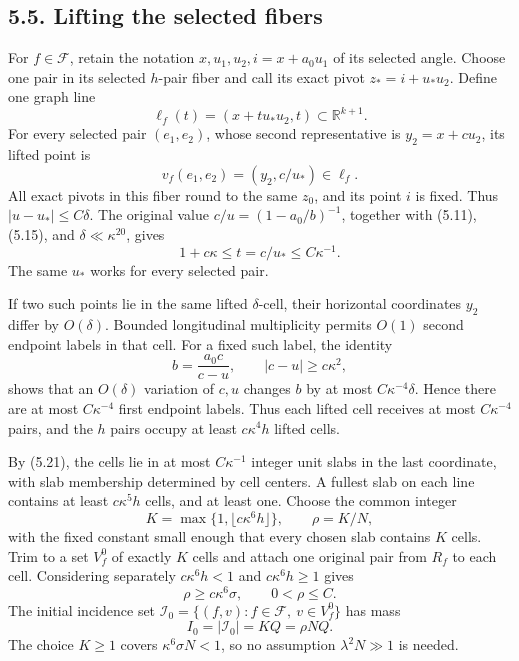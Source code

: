 \documentclass[
  11pt,
  a4paper,
]{article}
\begin{document}
\hypertarget{lifting-the-selected-fibers}{%
\subsection{5.5. Lifting the selected
fibers}\label{lifting-the-selected-fibers}}

For \(f\in\mathcal F\), retain the notation \(x,u_1,u_2,i=x+a_0u_1\) of
its selected angle. Choose one pair in its selected \(h\)-pair fiber and
call its exact pivot \(z_*=i+u_*u_2\). Define one graph line \[
 \ell_f(t)=(x+t u_*u_2,t)\subset\mathbb R^{k+1}.  \tag{5.20}\label{eq:5.20}
\] For every selected pair \((e_1,e_2)\), whose second representative is
\(y_2=x+c u_2\), its lifted point is \[
 v_f(e_1,e_2)=(y_2,c/u_*)\in\ell_f.
\] All exact pivots in this fiber round to the same \(z_0\), and its
point \(i\) is fixed. Thus \(|u-u_*|\le C\delta\). The original value
\(c/u=(1-a_0/b)^{-1}\), together with (5.11), (5.15), and
\(\delta\ll\kappa^{20}\), gives \[
 1+c\kappa\le t=c/u_*\le C\kappa^{-1}.           \tag{5.21}\label{eq:5.21}
\] The same \(u_*\) works for every selected pair.

If two such points lie in the same lifted \(\delta\)-cell, their
horizontal coordinates \(y_2\) differ by \(O(\delta)\). Bounded
longitudinal multiplicity permits \(O(1)\) second endpoint labels in
that cell. For a fixed such label, the identity \[
 b=\frac{a_0c}{c-u},\qquad |c-u|\ge c\kappa^2,
\] shows that an \(O(\delta)\) variation of \(c,u\) changes \(b\) by at
most \(C\kappa^{-4}\delta\). Hence there are at most \(C\kappa^{-4}\)
first endpoint labels. Thus each lifted cell receives at most
\(C\kappa^{-4}\) pairs, and the \(h\) pairs occupy at least
\(c\kappa^4h\) lifted cells.

By (5.21), the cells lie in at most \(C\kappa^{-1}\) integer unit slabs
in the last coordinate, with slab membership determined by cell centers.
A fullest slab on each line contains at least \(c\kappa^5h\) cells, and
at least one. Choose the common integer \[
 K=\max\{1,\lfloor c\kappa^6h\rfloor\},\qquad
 \rho=K/N,                                         \tag{5.22}\label{eq:5.22}
\] with the fixed constant small enough that every chosen slab contains
\(K\) cells. Trim to a set \(V_f^0\) of exactly \(K\) cells and attach
one original pair from \(R_f\) to each cell. Considering separately
\(c\kappa^6h<1\) and \(c\kappa^6h\ge1\) gives \[
 \rho\ge c\kappa^6\sigma,\qquad 0<\rho\le C.
\] The initial incidence set
\(\mathscr I_0=\{(f,v):f\in\mathcal F,\ v\in V_f^0\}\) has mass \[
 I_0=|\mathscr I_0|=KQ=\rho NQ.                                  \tag{5.23}\label{eq:5.23}
\] The choice \(K\ge1\) covers \(\kappa^6\sigma N<1\), so no assumption
\(\lambda^2N\gg1\) is needed.
\end{document}
